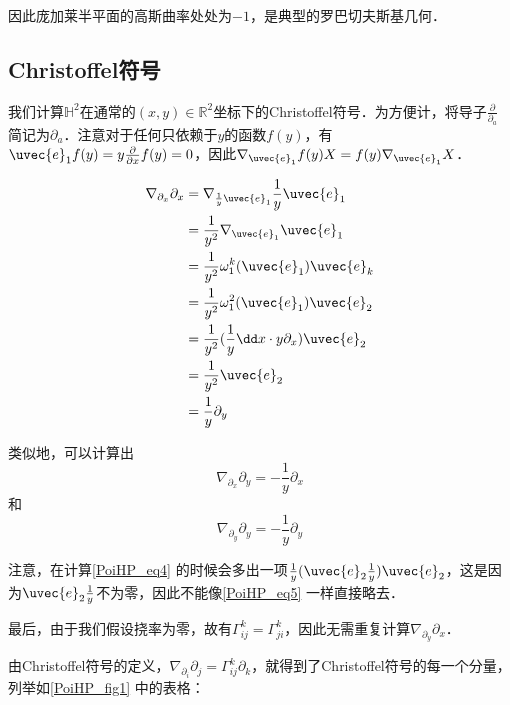 因此庞加莱半平面的高斯曲率处处为$-1$，是典型的罗巴切夫斯基几何．




\subsection{Christoffel符号}

我们计算$\mathbb{H}^2$在通常的$(x, y)\in\mathbb{R}^2$坐标下的Christoffel符号．为方便计，将导子$\frac{\partial}{\partial_a}$简记为$\partial_a$．注意对于任何只依赖于$y$的函数$f(y)$，有$\uvec{e}_1f(y)=y\frac{\partial}{\partial x}f(y)=0$，因此$\nabla_{\uvec{e}_1}f(y)X=f(y)\nabla_{\uvec{e}_1}X$．

\begin{equation}\label{PoiHP_eq5}
\begin{aligned}
\nabla_{\partial_x}\partial_x&=\nabla_{\frac{1}{y}\uvec{e}_1}\frac{1}{y}\uvec{e}_1\\
&=\frac{1}{y^2}\nabla_{\uvec{e}_1}\uvec{e}_1\\
&=\frac{1}{y^2}\omega^k_1(\uvec{e}_1)\uvec{e}_k\\
&=\frac{1}{y^2}\omega^2_1(\uvec{e}_1)\uvec{e}_2\\
&=\frac{1}{y^2}(\frac{1}{y}\dd x\cdot y\partial_x)\uvec{e}_2\\
&=\frac{1}{y^2}\uvec{e}_2\\
&=\frac{1}{y}\partial_y
\end{aligned}
\end{equation}

类似地，可以计算出
\begin{equation}
\nabla_{\partial_x}\partial_y=-\frac{1}{y}\partial_x
\end{equation}
和
\begin{equation}\label{PoiHP_eq4}
\nabla_{\partial_y}\partial_y=-\frac{1}{y}\partial_y
\end{equation}

注意，在计算\autoref{PoiHP_eq4} 的时候会多出一项$\frac{1}{y}(\uvec{e}_2\frac{1}{y})\uvec{e}_2$，这是因为$\uvec{e}_2\frac{1}{y}$不为零，因此不能像\autoref{PoiHP_eq5} 一样直接略去．

最后，由于我们假设挠率为零，故有$\Gamma^k_{ij}=\Gamma^k_{ji}$，因此无需重复计算$\nabla_{\partial_y}\partial_x$．

由Christoffel符号的定义，$\nabla_{\partial_i}\partial_j=\Gamma^k_{ij}\partial_k$，就得到了Christoffel符号的每一个分量，列举如\autoref{PoiHP_fig1} 中的表格：

